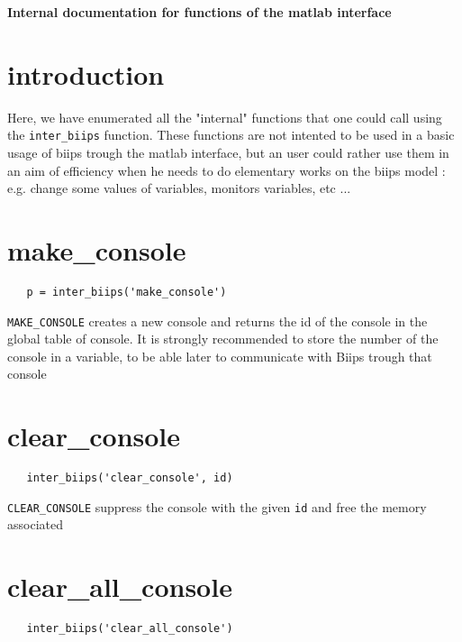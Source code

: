 \documentclass[11pt]{article}
\begin{document}
\begin{center}
{\Large \bf Internal documentation for functions of the matlab interface}
\end{center}

\tableofcontents

\section{introduction}

  Here, we have enumerated all the "internal" functions that one could call using the \texttt{inter\_biips} function. These functions are not intented
  to be used in a basic usage of biips trough the matlab interface, but an user could rather use them in an aim of efficiency when he needs to
  do elementary works on the biips model : e.g. change some values of variables, monitors variables, etc ...

\section{make\_console}
 \begin{lstlisting}
   p = inter_biips('make_console')
 \end{lstlisting}
   
   \texttt{MAKE\_CONSOLE}  creates a new console and returns the id of the console in the global table of console. It
   is strongly recommended to store the number of the console in a variable, to be able later to communicate with Biips trough that
   console

\section{clear\_console}

 \begin{lstlisting}
   inter_biips('clear_console', id)
 \end{lstlisting}

  \texttt{CLEAR\_CONSOLE} suppress the console with the given \texttt{id} and free the memory associated

\section{clear\_all\_console}
 
 \begin{lstlisting}
   inter_biips('clear_all_console')
 \end{lstlisting}
\end{document}

